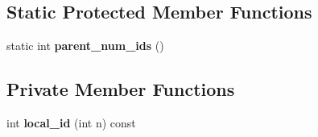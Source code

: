 \subsection*{Static Protected Member Functions}
\begin{DoxyCompactItemize}
\item 
static int {\bfseries parent\+\_\+num\+\_\+ids} ()\hypertarget{classv8_1_1internal_1_1_call_a79511e0f102618e143825b21f7bbb3af}{}\label{classv8_1_1internal_1_1_call_a79511e0f102618e143825b21f7bbb3af}

\end{DoxyCompactItemize}
\subsection*{Private Member Functions}
\begin{DoxyCompactItemize}
\item 
int {\bfseries local\+\_\+id} (int n) const \hypertarget{classv8_1_1internal_1_1_call_aa1098c8649a9e5800fc709168efcd79c}{}\label{classv8_1_1internal_1_1_call_aa1098c8649a9e5800fc709168efcd79c}

\end{DoxyCompactItemize}
